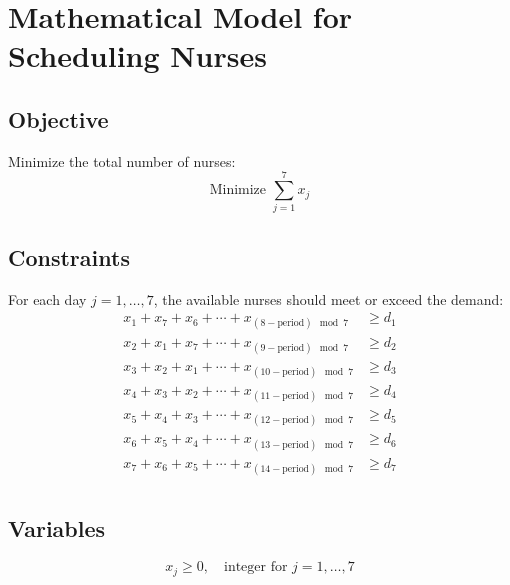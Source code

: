 \documentclass{article}
\begin{document}
\section*{Mathematical Model for Scheduling Nurses}

\subsection*{Objective}
Minimize the total number of nurses:
\[
\text{Minimize } \sum_{j=1}^{7} x_j
\]

\subsection*{Constraints}
For each day \( j = 1, \ldots, 7 \), the available nurses should meet or exceed the demand:
\[
\begin{align*}
x_1 + x_7 + x_6 + \cdots + x_{(8-\text{period}) \mod 7} &\geq d_1 \\
x_2 + x_1 + x_7 + \cdots + x_{(9-\text{period}) \mod 7} &\geq d_2 \\
x_3 + x_2 + x_1 + \cdots + x_{(10-\text{period}) \mod 7} &\geq d_3 \\
x_4 + x_3 + x_2 + \cdots + x_{(11-\text{period}) \mod 7} &\geq d_4 \\
x_5 + x_4 + x_3 + \cdots + x_{(12-\text{period}) \mod 7} &\geq d_5 \\
x_6 + x_5 + x_4 + \cdots + x_{(13-\text{period}) \mod 7} &\geq d_6 \\
x_7 + x_6 + x_5 + \cdots + x_{(14-\text{period}) \mod 7} &\geq d_7 \\
\end{align*}
\]

\subsection*{Variables}
\[
x_j \geq 0, \quad \text{integer for } j = 1, \ldots, 7
\]
\end{document}

